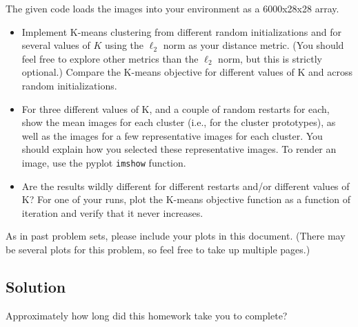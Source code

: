 \documentclass[submit]{harvardml}
\begin{document}
\begin{problem}
The given code loads the images into your environment as a 6000x28x28 array.

\begin{itemize}
\item Implement K-means clustering
from different random initializations 
and for several values of $K$ using the 
$\ell_2$ norm as your
distance metric. (You should feel free to explore other metrics 
than the $\ell_2$ norm, but this is strictly optional.)  Compare the 
K-means objective for different values of K and across random
initializations.
%
\item For three different values of K,
and a couple of random restarts for each, 
show the mean images for each cluster (i.e., for
the cluster prototypes), as well as the images for a 
few representative images for each cluster. You should explain how you selected
these representative images. To render an image, use the pyplot \texttt{imshow} function. 

\item Are the results wildly different for different
restarts and/or different 
values of K?
For one of your runs, plot the K-means objective function as a function of iteration and verify that
it never increases.


\end{itemize}


As in past problem sets, please include your plots in this
document. (There may be several plots for this problem, so feel free
to take up multiple pages.)




\end{problem}
\subsection*{Solution}




\newpage
\begin{problem}[Calibration, 1pt]
Approximately how long did this homework take you to complete?
\end{problem}
\end{document}
